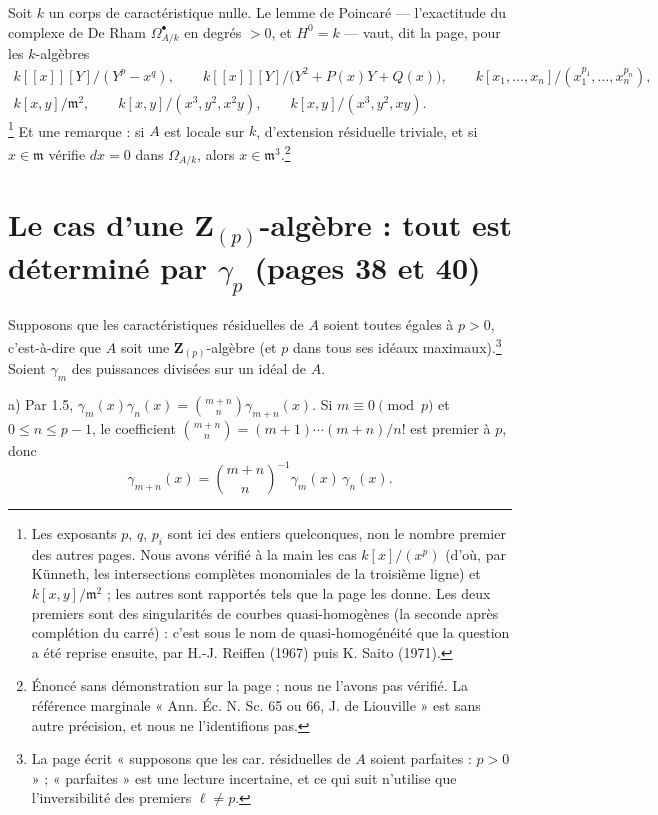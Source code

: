 \documentclass[11pt,a4paper]{article}
\begin{document}
Soit $k$ un corps de caractéristique nulle. Le lemme de Poincaré — l'exactitude
du complexe de De Rham $\Omega^{\bullet}_{A/k}$ en degrés $> 0$, et
$H^{0} = k$ — vaut, dit la page, pour les $k$-algèbres
\[
\begin{gathered}
k[[x]][Y]/(Y^{p} - x^{q}), \qquad k[[x]][Y]/\bigl(Y^{2} + P(x)Y + Q(x)\bigr),
\qquad k[x_1, \ldots, x_n]/(x_1^{p_1}, \ldots, x_n^{p_n}), \\
k[x, y]/\mathfrak{m}^{2}, \qquad k[x,y]/(x^{3}, y^{2}, x^{2}y), \qquad
k[x,y]/(x^{3}, y^{2}, xy) .
\end{gathered}
\]
\footnote{Les exposants $p$, $q$, $p_i$ sont ici des entiers quelconques,
non le nombre premier des autres pages. Nous avons vérifié à la main les
cas $k[x]/(x^{p})$ (d'où, par Künneth, les intersections complètes
monomiales de la troisième ligne) et $k[x,y]/\mathfrak{m}^{2}$ ; les autres
sont rapportés tels que la page les donne. Les deux premiers sont des
singularités de courbes quasi-homogènes (la seconde après complétion du
carré) : c'est sous le nom de quasi-homogénéité que la question a été
reprise ensuite, par H.-J. Reiffen (1967) puis K. Saito (1971).} Et une
remarque : si $A$ est locale sur $k$, d'extension résiduelle triviale, et si
$x \in \mathfrak{m}$ vérifie $dx = 0$ dans $\Omega_{A/k}$, alors $x \in
\mathfrak{m}^{3}$.\footnote{Énoncé sans démonstration sur la page ; nous ne
l'avons pas vérifié. La référence marginale « Ann. Éc. N. Sc. 65 ou 66, J.
de Liouville » est sans autre précision, et nous ne l'identifions pas.}

\section*{Le cas d'une $\mathbf{Z}_{(p)}$-algèbre : tout est déterminé par $\gamma_p$ (pages 38 et 40)}

Supposons que les caractéristiques résiduelles de $A$ soient toutes égales
à $p > 0$, c'est-à-dire que $A$ soit une $\mathbf{Z}_{(p)}$-algèbre (et $p$
dans tous ses idéaux maximaux).\footnote{La page écrit « supposons que les
car. résiduelles de $A$ soient parfaites : $p > 0$ » ; « parfaites » est une
lecture incertaine, et ce qui suit n'utilise que l'inversibilité des premiers
$\ell \neq p$.} Soient $\gamma_m$ des puissances divisées sur un idéal de
$A$.

a) Par 1.5, $\gamma_m(x)\gamma_n(x) = \binom{m+n}{n}\gamma_{m+n}(x)$. Si $m
\equiv 0 \pmod p$ et $0 \leqslant n \leqslant p-1$, le coefficient
$\binom{m+n}{n} = (m+1)\cdots(m+n)/n!$ est premier à $p$, donc
\[
\gamma_{m+n}(x) = \binom{m+n}{n}^{-1}\gamma_m(x)\,\gamma_n(x).
\]
\end{document}
